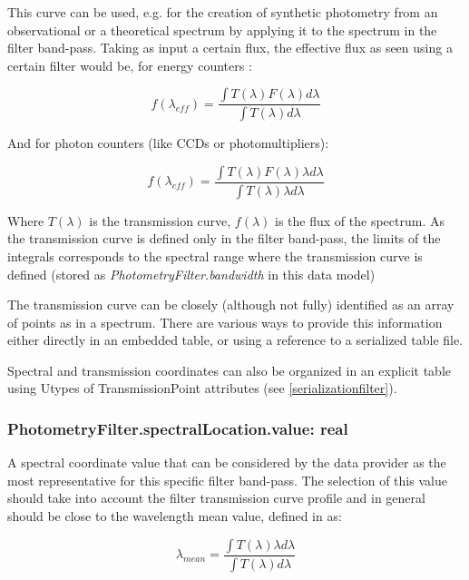 \documentclass[11pt,a4paper]{ivoa}
\begin{document}

\par

This curve can be used, e.g. for the creation of synthetic photometry 
\citep{1996BaltA...5..459S,2004A&A...422..205G} from an observational 
or a theoretical spectrum by applying it to the spectrum in the filter band-pass. 
Taking as input a certain flux, the effective flux as seen using a certain 
filter would be, for energy counters \citep{2007ASPC..364..227M}:

\begin{equation} \label{eq:14}
f(\lambda_{eff}) = \frac{\int T(\lambda)F(\lambda)d\lambda}{\int T(\lambda)d\lambda}
\end{equation}

And for photon counters (like CCDs or photomultipliers):

\begin{equation} \label{eq:15}
f(\lambda_{eff}) = \frac{\int T(\lambda)F(\lambda)\lambda d\lambda}{\int T(\lambda)\lambda d\lambda}
\end{equation}

Where $T(\lambda)$ is the transmission curve, $f(\lambda)$ is the flux of 
the spectrum. As the transmission curve is defined only in the filter 
band-pass, the limits of the integrals corresponds to the spectral range where 
the transmission curve is defined (stored as \textit{PhotometryFilter.bandwidth} 
in this data model)
\par

The transmission curve can be closely (although not fully) identified as an array 
of points as in a spectrum. There are various ways to provide this information 
either directly in an embedded table, or using a reference to a serialized table 
file.
\par

Spectral and transmission coordinates can also be organized  in an explicit table using 
Utypes of TransmissionPoint attributes (see \ref{serializationfilter}).
\par

\subsubsection{PhotometryFilter.spectralLocation.value: real}
A spectral coordinate value that can be considered by the data provider as the 
most representative for this specific filter band-pass. The selection of this 
value should take into account the filter transmission curve profile and in 
general should be close to the wavelength mean value, defined 
in \citet{1982AJ.....87..670O} as:
\par
\begin{equation} \label{eq:16}
\lambda_{mean} = \frac{\int T(\lambda)\lambda d\lambda}{\int T(\lambda)d\lambda}
\end{equation}
\end{document}
